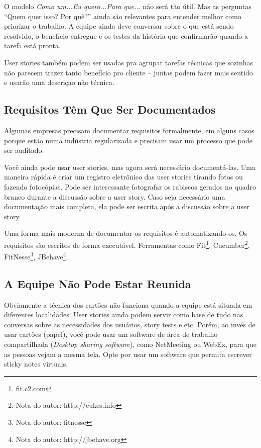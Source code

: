 \documentclass[a4paper, 10pt, font=plain]{abnt}
\begin{document}
O modelo \textit{Como um...Eu quero...Para que...} não será tão útil. Mas as perguntas ``Quem quer isso? Por quê?'' ainda são relevantes para entender melhor como priorizar o trabalho. A equipe ainda deve conversar sobre o que está sendo resolvido, o benefício entregue e os testes da história que confirmarão quando a tarefa está pronta.

User stories também podem ser usadas pra agrupar tarefas técnicas que sozinhas não parecem trazer tanto benefício pro cliente -- juntas podem fazer mais sentido e usarão uma descriçao não técnica.


\subsection{Requisitos Têm Que Ser Documentados}
Algumas empresas precisam documentar requisitos formalmente, em alguns casos porque estão numa indústria regularizada e precisam usar um processo que pode ser auditado.

Você ainda pode usar user stories, mas agora será necessário documentá-las. Uma maneira rápida é criar um registro eletrônico das user stories tirando fotos ou fazendo fotocópias. Pode ser interessante fotografar os rabiscos gerados no quadro branco durante a discussão sobre a user story. Caso seja necessário uma documentação mais completa, ela pode ser escrita após a discussão sobre a user story.

Uma forma mais moderna de documentar os requisitos é automatizando-os. Os requisitos são escritos de forma executável. Ferramentas como Fit\footnote{fit.c2.com}, Cucumber\footnote{Nota do autor: http://cukes.info}, FitNesse\footnote{Nota do autor: fitnesse}, JBehave\footnote{Nota do autor: http://jbehave.org}.

\subsection{A Equipe Não Pode Estar Reunida}
Obviamente a técnica dos cartões não funciona quando a equipe está situada em diferentes localidades. User stories ainda podem servir como base de tudo nas conversas sobre as necessidades dos usuários, story tests e etc. Porém, ao invés de usar cartões (papel), você pode usar um software de área de trabalho compartilhada (\textit{Desktop sharing software}), como NetMeeting ou WebEx, para que as pessoas vejam a mesma tela. Opte por usar um software que permita escrever sticky notes virtuais.
\end{document}
